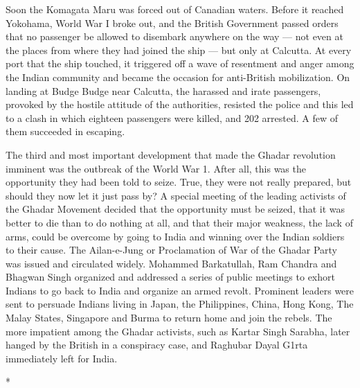 Soon the Komagata Maru was forced out of Canadian waters. Before it reached Yokohama, World War I broke out, and the British Government passed orders that no passenger be allowed to disembark anywhere on the way — not even at the places from where they had joined the ship — but only at Calcutta. At every port that the ship touched, it triggered off a wave of resentment and anger among the Indian community and became the occasion for anti-British mobilization. On landing at Budge Budge near Calcutta, the harassed and irate passengers, provoked by the hostile attitude of the authorities, resisted the police and this led to a clash in which eighteen passengers were killed, and 202 arrested. A few of them succeeded in escaping.

The third and most important development that made the Ghadar revolution imminent was the outbreak of the World War 1. After all, this was the opportunity they had been told to seize. True, they were not really prepared, but should they now let it just pass by? A special meeting of the leading activists of the Ghadar Movement decided that the opportunity must be seized, that it was better to die than to do nothing at all, and that their major weakness, the lack of arms, could be overcome by going to India and winning over the Indian soldiers to their cause. The Ailan-e-Jung or Proclamation of War of the Ghadar Party was issued and circulated widely. Mohammed Barkatullah, Ram Chandra and Bhagwan Singh organized and addressed a series of public meetings to exhort Indians to go back to India and organize an armed revolt. Prominent leaders were sent to persuade Indians living in Japan, the Philippines, China, Hong Kong, The Malay States, Singapore and Burma to return home and join the rebels. The more impatient among the Ghadar activists, such as Kartar Singh Sarabha, later hanged by the British in a conspiracy case, and Raghubar Dayal G1rta immediately left for India.

\begin{center}*\end{center}



